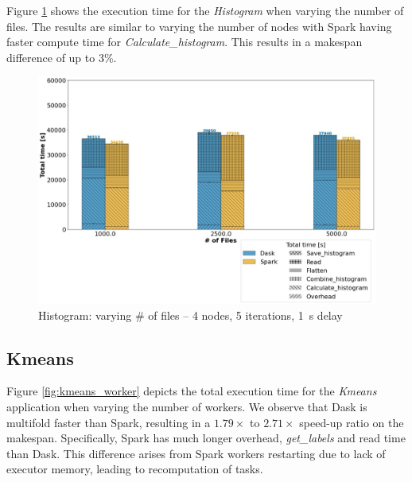 \documentclass[conference]{IEEEtran}
\begin{document}
Figure \ref{fig:histogram_block} shows the execution time for the \textit{Histogram} when varying the number of files.
The results are similar to varying the number of nodes with Spark having faster compute time for \textit{Calculate\_histogram}.
This results in a makespan difference of up to 3\%.
\begin{figure}[!t]
	\centering
	\includegraphics[clip,width=\columnwidth]{figures/stacked_histogram_block.jpg}
	\caption{Histogram: varying \# of files -- 4 nodes, 5 iterations, \SI{1}{\second} delay}
	\label{fig:histogram_block}
\end{figure}

\subsection{Kmeans}
Figure \ref{fig:kmeans_worker} depicts the total execution time for the \textit{Kmeans} application when varying the number of workers.
We observe that Dask is multifold faster than Spark, resulting in a $1.79\times$ to $2.71\times$ speed-up ratio on the makespan.
Specifically, Spark has much longer overhead, \textit{get\_labels} and read time than Dask.
This difference arises from Spark workers restarting due to lack of executor memory, leading to recomputation of tasks.
\end{document}
